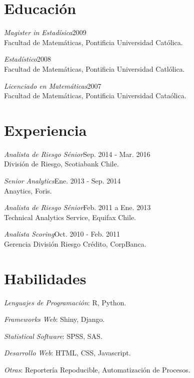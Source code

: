 \documentclass[margin]{res}
\begin{document}
\begin{resume}

\section{Educación}

    {\sl Magister in Estadísica}\hfill 2009\\
    Facultad de Matemáticas, Pontificia Universidad Católica.

    {\sl Estadístico}\hfill 2008\\
    Facultad de Matemáticas, Pontificia Universidad Catlólica.

    {\sl Licenciado en Matemáticas}\hfill 2007\\
    Facultad de Matemáticas, Pontificia Universidad Cataólica.

\vspace{1cm}

\section{Experiencia}

    {\sl Analista de Riesgo Sénior}\hfill Sep. 2014 - Mar. 2016\\
        División de Riesgo, Scotiabank Chile.

    {\sl Senior Analytics}\hfill Ene. 2013 - Sep. 2014\\
    Anaytics, Foris.

    {\sl Analista de Riesgo Sénior}\hfill Feb. 2011 a Ene. 2013\\
    Technical Analytics Service, Equifax Chile.

    {\sl Analista Scoring}\hfill Oct. 2010 - Feb. 2011\\
    Gerencia División Riesgo Crédito, CorpBanca.

\vspace{1cm}

\section{Habilidades}

    {\sl Lenguajes de Programación}: R, Python.

    {\sl Frameworks Web}: Shiny, Django.

    {\sl Statistical Software}: SPSS, SAS.
    
    {\sl Desarrollo Web}: HTML, CSS, Javascript.
    
    {\sl Otras}: Reportería Repoducible, Automatización de Procesos.


\end{resume}
\end{document}

